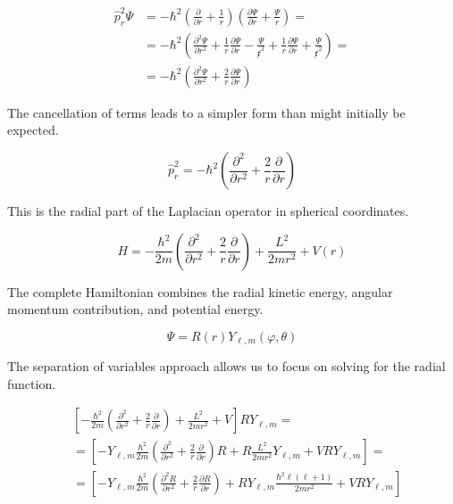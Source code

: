 \documentclass[italian]{HKNdocument}
\begin{document}
\begin{align}
\hat{p}_{r}^{2} \Psi & =-\hbar^{2}\left(\frac{\partial}{\partial r}+\frac{1}{r}\right)\left(\frac{\partial \Psi}{\partial r}+\frac{\Psi}{r}\right)= \\
& =-\hbar^{2}\left(\frac{\partial^{2} \Psi}{\partial r^{2}}+\frac{1}{r} \frac{\partial \Psi}{\partial r}-\frac{\Psi}{\not r^{2}}+\frac{1}{r} \frac{\partial \Psi}{\partial r}+\frac{\Psi}{\not r^{2}}\right)=  \\
& =-\hbar^{2}\left(\frac{\partial^{2} \Psi}{\partial r^{2}}+\frac{2}{r} \frac{\partial \Psi}{\partial r}\right)
\end{align}

The cancellation of terms leads to a simpler form than might initially be expected.

\begin{equation}
\hat{p}_{r}^{2}=-\hbar^{2}\left(\frac{\partial^{2}}{\partial r^{2}}+\frac{2}{r} \frac{\partial}{\partial r}\right)
\end{equation}

This is the radial part of the Laplacian operator in spherical coordinates.

\begin{equation}
H=-\frac{\hbar^{2}}{2 m}\left(\frac{\partial^{2}}{\partial r^{2}}+\frac{2}{r} \frac{\partial}{\partial r}\right)+\frac{L^{2}}{2 m r^{2}}+V(r)
\end{equation}

The complete Hamiltonian combines the radial kinetic energy, angular momentum contribution, and potential energy.

\begin{equation}
\Psi=R(r) Y_{\ell, m}(\varphi, \theta)
\end{equation}

The separation of variables approach allows us to focus on solving for the radial function.

\begin{align}
& {\left[-\frac{\hbar^{2}}{2 m}\left(\frac{\partial^{2}}{\partial r^{2}}+\frac{2}{r} \frac{\partial}{\partial r}\right)+\frac{L^{2}}{2 m r^{2}}+V\right] R Y_{\ell, m}=} \\
& =\left[-Y_{\ell, m} \frac{\hbar^{2}}{2 m}\left(\frac{\partial^{2}}{\partial r^{2}}+\frac{2}{r} \frac{\partial}{\partial r}\right) R+R \frac{L^{2}}{2 m r^{2}} Y_{\ell, m}+V R Y_{\ell, m}\right]=  \\
& =\left[-Y_{\ell, m} \frac{\hbar^{2}}{2 m}\left(\frac{\partial^{2} R}{\partial r^{2}}+\frac{2}{r} \frac{\partial R}{\partial r}\right)+R Y_{\ell, m} \frac{\hbar^{2} \ell(\ell+1)}{2 m r^{2}}+V R Y_{\ell, m}\right]
\end{align}
\end{document}
